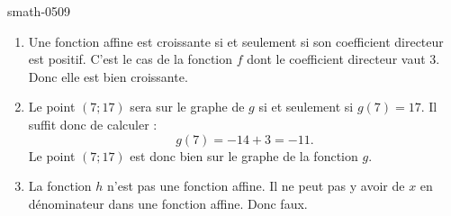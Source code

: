 
\begin{corrige}{smath-0509}

    \begin{enumerate}
        \item
            Une fonction affine est croissante si et seulement si son coefficient directeur est positif. C'est le cas de la fonction \( f\) dont le coefficient directeur vaut \( 3\). Donc elle est bien croissante.
        \item
            Le point \( (7;17)\) sera sur le graphe de \( g\) si et seulement si \( g(7)=17\). Il suffit donc de calculer :
            \begin{equation}
                g(7)=-14+3=-11.
            \end{equation}
            Le point \( (7;17)\) est donc bien sur le graphe de la fonction \( g\).
        \item
            La fonction \( h \) n'est pas une fonction affine. Il ne peut pas y avoir de \( x\) en dénominateur dans une fonction affine. Donc faux.
    \end{enumerate}

\end{corrige}
